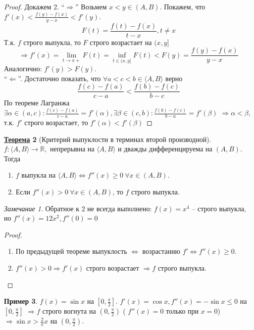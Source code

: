 \documentclass[12pt]{article}
\newenvironment{MyList}[1][4pt]{
  \begin{enumerate}[1.]
  \setlength{\parskip}{0pt}
  \setlength{\itemsep}{#1}
}{       
  \end{enumerate}
}
\def\R{\mathbb{R}}       %
\def\SO{\Rightarrow}     %
\def\EQ{\Leftrightarrow} %
\theoremstyle{definition} %
\newtheorem{Thm}{\underline{Теорема}}[subsection] %
\newtheorem{Example}[Thm]{Пример} %
\theoremstyle{plain} %
\theoremstyle{remark} %
\newtheorem{Rem}[Thm]{Замечание} %
\begin{document}
\begin{proof}
    Докажем 2. ``$\SO$'' 
    Возьмем $x < y \in (A, B)$. Покажем, что $f'(x) < \frac{f(y) - f(x)}{y - x} < f'(y)$.
    \[F(t) = \frac{f(t) - f(x)}{t - x}, t \neq x\]
    Т.к. $f$ строго выпукла, то $F$ строго возрастает на $(x, y]$
    \[\SO f'(x) = \lim_{t \to x+} F(t) = \inf_{t \in (x, y]} F(t) < F(y) = \frac{f(y) - f(x)}{y - x}\]
    Аналогично: $f'(y) > F(y)$. \\
    ``$\Leftarrow$''. Достаточно показать, что $\forall a < c < b \in \langle A, B\rangle$ верно
    \[ \frac{f(c) - f(a)}{c - a} < \frac{f(b) - f(c)}{b - c}\]
    По теореме Лагранжа $\exists \alpha \in (a, c) : \frac{f(c) - f(a)}{c - a} = f'(\alpha), \exists \beta \in (c, b) : \frac{f(b) - f(c)}{b - a} = f'(\beta)$
    $\SO \alpha < \beta$, т.к. $f'$ строго возрастает, то $f'(\alpha) < f'(\beta)$ 
\end{proof}

\begin{Thm}[Критерий выпуклости в терминах второй производной]
    $f : \langle A, B\rangle \to \R, $ непрерывна на $\langle A, B\rangle$ и дважды дифференцируема на $(A, B)$.
    Тогда
    \begin{MyList}
        \item $f$ выпукла на $\langle A, B\rangle \EQ f''(x) \geqslant 0 \ \forall x \in (A, B)$.
        \item Если $f''(x) > 0 \ \forall x \in (A, B)$, то $f$ строго выпукла.
    \end{MyList}

    \begin{Rem}
        Обратное к 2 не всегда выполнено: $f(x) = x^4$ -- строго выпукла, но $f''(x) = 12x^2, f''(0) = 0$ 
    \end{Rem}
\end{Thm}

\begin{proof}
    \begin{MyList}
        \item По предыдущей теореме выпуклость $\EQ$ возрастанию $f' \EQ f''(x) \geqslant 0$.
        
        \item $f''(x) > 0 \SO f'(x)$ строго возрастает $\SO f$ строго выпукла. 
    \end{MyList}
\end{proof}

\begin{Example}
    $f(x) = \sin x$ на $\left[0, \frac{\pi}{2}\right]$. $f'(x) = \cos x, f''(x) = -\sin x \leqslant 0$ на $\left[0, \frac{\pi}{2}\right]$
    $\SO f$ строго вогнута на $\left(0, \frac{\pi}{2}\right)$ ( $f''(x) = 0$ только при $x = 0$) $\SO \sin x > \frac{2}{\pi} x$ на $\left(0, \frac{\pi}{2}\right)$.  
\end{Example}
\end{document}
